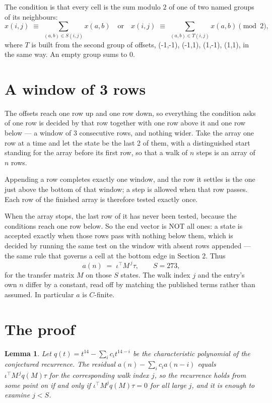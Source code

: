 \documentclass[11pt,a4paper]{article}
\theoremstyle{plain}
\newtheorem{lemma}[theorem]{Lemma}
\theoremstyle{definition}
\begin{document}
The condition is that every cell is the sum modulo $2$ of one of two named groups of its neighbours:
\[
x(i,j)\;\equiv\;\sum_{(a,b)\in S(i,j)}x(a,b) \quad\text{or}\quad x(i,j)\;\equiv\;\sum_{(a,b)\in T(i,j)}x(a,b) \pmod{2},
\]
where $T$ is built from the second group of offsets, (-1,-1), (-1,1), (1,-1), (1,1), in the same way. An empty group sums to $0$.

\section{A window of 3 rows}

The offsets reach one row up and one row down, so everything the condition asks of one row is
decided by that row together with one row above it and one row below --- a window of
$3$ consecutive rows, and nothing wider. Take the array one row at a time
and let the state be the last 2 of them, with a distinguished start standing for the
array before its first row, so that a walk of $n$ steps is an array of $n$ rows.

Appending a row completes exactly one window, and the row it settles is the one just above the bottom of that window; a step is
allowed when that row passes. Each row of the finished
array is therefore tested exactly once.

When the array stops, the last row of it has never been tested, because the
conditions reach one row below. So the end vector is NOT all ones: a state is accepted exactly when
those rows pass with nothing below them, which is decided by running the same test on the window
with absent rows appended --- the same rule that governs a cell at the bottom edge in
Section 2.
Thus
\[
a(n)\;=\;\iota^{\!\top}M^{\,j}\tau ,\qquad S=273,
\]
for the transfer matrix $M$ on those $S$ states. The walk index $j$ and the entry's own $n$
differ by a constant, read off by matching the published terms rather than assumed. In
particular $a$ is $C$-finite.

\section{The proof}

\begin{lemma}\label{lem:crit}
Let $q(t)=t^{14}-\sum_i c_it^{14-i}$ be the characteristic polynomial of the
conjectured recurrence. The residual $a(n)-\sum_ic_ia(n-i)$ equals
$\iota^{\!\top}M^{\,j}q(M)\tau$ for the corresponding walk index $j$, so the recurrence
holds from some point on if and only if $\iota^{\!\top}M^{j}q(M)\tau=0$ for all large $j$,
and it is enough to examine $j<S$.
\end{lemma}
\end{document}
